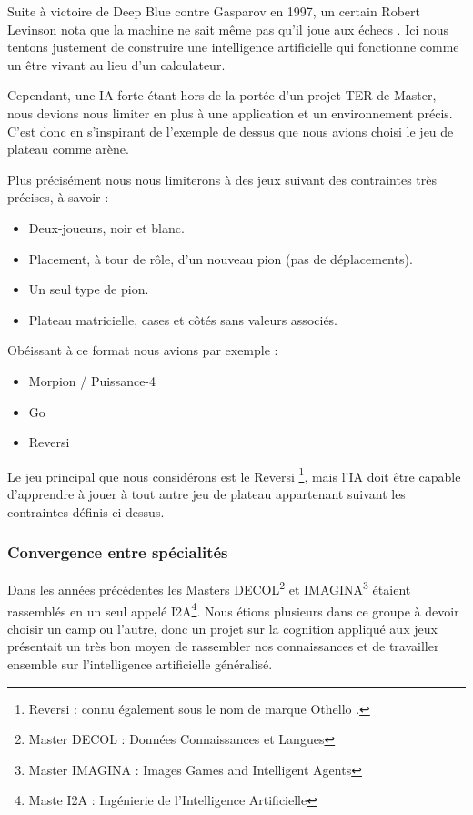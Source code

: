 Suite à victoire de Deep Blue contre Gasparov en 1997, un certain Robert Levinson nota que la machine \og ne sait même pas qu'il joue aux échecs \fg{}. Ici nous tentons justement de construire une intelligence artificielle qui fonctionne comme un être vivant au lieu d'un calculateur.

Cependant, une IA \og forte \fg{} étant hors de la portée d'un projet TER de Master, nous devions nous limiter en plus à une application et un environnement précis. C'est donc en s'inspirant de l'exemple de dessus que nous avions choisi le jeu de plateau comme arène.

Plus précisément nous nous limiterons à des jeux suivant des contraintes très précises, à savoir :

\begin{itemize}
\item Deux-joueurs, noir et blanc.
\item Placement, à tour de rôle, d'un nouveau pion (pas de déplacements).
\item Un seul type de pion.
\item Plateau matricielle, cases et côtés sans valeurs associés.
\end{itemize}

Obéissant à ce format nous avions par exemple :

\begin{itemize}
\item Morpion / Puissance-4
\item Go
\item Reversi
\end{itemize}

Le jeu principal que nous considérons est le \og Reversi \footnote{ \og Reversi \fg{} : connu également sous le nom de marque \og Othello \fg{}. }\fg{}, mais l'IA doit être capable d'apprendre à jouer à tout autre jeu de plateau appartenant suivant les contraintes définis ci-dessus.

\subsubsection{Convergence entre spécialités }
Dans les années précédentes les Masters DECOL\footnote{ Master DECOL : \og Données Connaissances et Langues \fg{} } et IMAGINA\footnote{ Master IMAGINA : \og Images Games and Intelligent Agents \fg{} } étaient rassemblés en un seul appelé I2A\footnote { Maste I2A : \og Ingénierie de l'Intelligence Artificielle \fg{} }.
Nous étions plusieurs dans ce groupe à devoir choisir un camp ou l'autre, donc un projet sur la cognition appliqué aux jeux présentait un très bon moyen de rassembler nos connaissances et de travailler ensemble sur l'intelligence artificielle généralisé.

